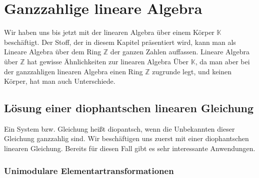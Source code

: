 \documentclass[
a4paper,12pt,
bibliography=totocnumbered,
numbers=noenddot,
]{scrartcl}
\numberwithin{equation}{subsection}
\newcommand{\Z}{\mathbb Z}
\newcommand{\K}{\mathbb K}
\theoremstyle{plain}
\theoremstyle{definition}
\begin{document}
\section{Ganzzahlige lineare Algebra} 

Wir haben uns bis jetzt mit der linearen Algebra über einem Körper $\K$ beschäftigt. Der Stoff, der in diesem Kapitel präsentiert wird, kann man als Lineare Algebra über dem Ring $\Z$ der ganzen Zahlen auffassen. Lineare Algebra über $\Z$ hat gewisse Ähnlichkeiten zur linearen Algebra Über $\K$, da man aber  bei der ganzzahligen linearen Algebra einen Ring $\Z$ zugrunde legt, und keinen Körper, hat man auch Unterschiede.

\subsection{Lösung einer diophantschen linearen Gleichung} 

Ein System bzw. Gleichung heißt diopantsch, wenn die Unbekannten dieser Gleichung ganzzahlig sind. Wir beschäftigen uns zuerst mit einer diophantschen linearen Gleichung. Bereits für diesen Fall gibt es sehr interessante Anwendungen. 

\subsubsection{Unimodulare  Elementartransformationen}
\end{document}
